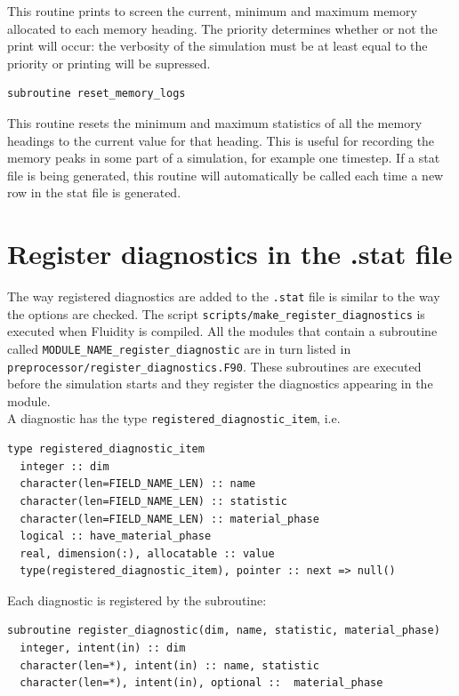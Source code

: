 \documentclass[a4paper, 11pt]{book}
\begin{document}
This routine prints to screen the current, minimum and maximum memory
allocated to each memory heading. The priority determines whether or not the
print will occur: the verbosity of the simulation must be at least equal to
the priority or printing will be supressed.


\begin{lstlisting}
subroutine reset_memory_logs  
\end{lstlisting}

This routine resets the minimum and maximum statistics of all the memory
headings to the current value for that heading. This is useful for recording
the memory peaks in some part of a simulation, for example one timestep. If
 a stat file is being generated, this routine will automatically be called
 each time a new row in the stat file is generated.

\section{Register diagnostics in the .stat file}

The way registered diagnostics are added to the \lstinline+.stat+ file is similar to the way the options are checked. The script \lstinline+scripts/make_register_diagnostics+ is executed when Fluidity is compiled. All the modules that contain a subroutine called \lstinline+MODULE_NAME_register_diagnostic+ are in turn listed in \lstinline+preprocessor/register_diagnostics.F90+. These subroutines are executed before the simulation starts and they register the diagnostics appearing in the module.\\
 
A diagnostic has the type \lstinline+registered_diagnostic_item+, i.e.

\begin{lstlisting}
type registered_diagnostic_item
  integer :: dim
  character(len=FIELD_NAME_LEN) :: name
  character(len=FIELD_NAME_LEN) :: statistic
  character(len=FIELD_NAME_LEN) :: material_phase
  logical :: have_material_phase
  real, dimension(:), allocatable :: value
  type(registered_diagnostic_item), pointer :: next => null()
\end{lstlisting}

Each diagnostic is registered by the subroutine:\\

\begin{lstlisting}
subroutine register_diagnostic(dim, name, statistic, material_phase)
  integer, intent(in) :: dim
  character(len=*), intent(in) :: name, statistic 
  character(len=*), intent(in), optional ::  material_phase
\end{lstlisting}
\end{document}
